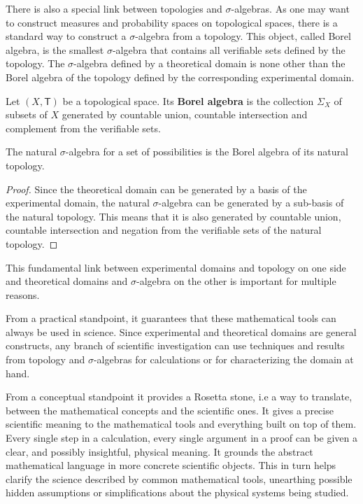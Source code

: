 \documentclass[11pt,letterpaper,fleqn]{memoir} %
\begin{document}
There is also a special link between topologies and $\sigma$-algebras. As one may want to construct measures and probability spaces on topological spaces, there is a standard way to construct a $\sigma$-algebra from a topology. This object, called Borel algebra, is the smallest $\sigma$-algebra that contains all verifiable sets defined by the topology. The $\sigma$-algebra defined by a theoretical domain is none other than the Borel algebra of the topology defined by the corresponding experimental domain.

\begin{mathSection}
	
	\begin{defn}
		Let $(X, \mathsf{T})$ be a topological space. Its \textbf{Borel algebra} is the collection $\Sigma_X$ of subsets of $X$ generated by countable union, countable intersection and complement from the verifiable sets.
	\end{defn}
	
	\begin{prop}
		The natural $\sigma$-algebra for a set of possibilities is the Borel algebra of its natural topology.
	\end{prop}
	
	\begin{proof}
		Since the theoretical domain can be generated by a basis of the experimental domain, the natural $\sigma$-algebra can be generated by a sub-basis of the natural topology. This means that it is also generated by countable union, countable intersection and negation from the verifiable sets of the natural topology.
	\end{proof}
\end{mathSection}

This fundamental link between experimental domains and topology on one side and theoretical domains and $\sigma$-algebra on the other is important for multiple reasons.

From a practical standpoint, it guarantees that these mathematical tools can always be used in science. Since experimental and theoretical domains are general constructs, any branch of scientific investigation can use techniques and results from topology and $\sigma$-algebras for calculations or for characterizing the domain at hand.

From a conceptual standpoint it provides a Rosetta stone, i.e a way to translate, between the mathematical concepts and the scientific ones. It gives a precise scientific meaning to the mathematical tools and everything built on top of them. Every single step in a calculation, every single argument in a proof can be given a clear, and possibly insightful, physical meaning. It grounds the abstract mathematical language in more concrete scientific objects. This in turn helps clarify the science described by common mathematical tools, unearthing possible hidden assumptions or simplifications about the physical systems being studied.
\end{document}
